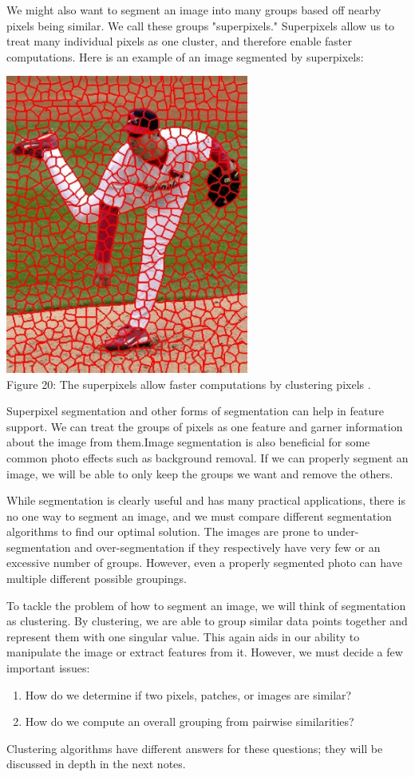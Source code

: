 \documentclass{article}
\begin{document}
We might also want to segment an image into many groups based off nearby pixels being similar. We call these groups "superpixels." Superpixels allow us to treat many individual pixels as one cluster, and therefore enable faster computations. Here is an example of an image segmented by superpixels:

\begin{center}
\includegraphics[width=8cm]{superpixels.png} \\
Figure 20: The superpixels allow faster computations by clustering pixels \cite{ren2003learning}.
\end{center}

Superpixel segmentation and other forms of segmentation can help in feature support. We can treat the groups of pixels as one feature and garner information about the image from them.Image segmentation is also beneficial for some common photo effects such as background removal. If we can properly segment an image, we will be able to only keep the groups we want and remove the others.

While segmentation is clearly useful and has many practical applications, there is no one way to segment an image, and we must compare different segmentation algorithms to find our optimal solution. The images are prone to under-segmentation and over-segmentation if they respectively have very few or an excessive number of groups. However, even a properly segmented photo can have multiple different possible groupings.

To tackle the problem of how to segment an image, we will think of segmentation as clustering. By clustering, we are able to group similar data points together and represent them with one singular value. This again aids in our ability to manipulate the image or extract features from it. However, we must decide a few important issues:
\begin{enumerate}
\item How do we determine if two pixels, patches, or images are similar?
\item How do we compute an overall grouping from	
pairwise similarities?
\end{enumerate}
Clustering algorithms have different answers for these questions; they will be discussed in depth in the next notes.
\end{document}
